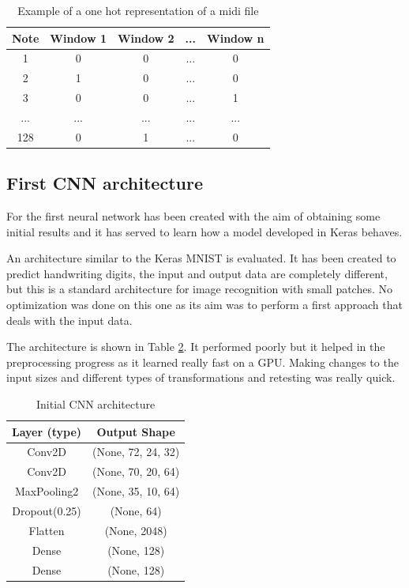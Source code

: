 \begin{table}
	\centering
	\caption{Example of a one hot representation of a midi file}
	\begin{tabular}{||c c c c c||} 
		\hline
		Note & Window 1 & Window 2 & ... & Window n \\ [0.5ex] 
		\hline\hline
		1 & 0 & 0 & ... & 0 \\ 
		\hline
		2 & 1 & 0 & ... & 0 \\
		\hline
		3 & 0 & 0 & ... & 1 \\
		\hline
		... & ... & ... & ... & ... \\
		\hline
		128 & 0 & 1 & ... & 0 \\ [1ex] 
		\hline
	\end{tabular}
	\label{table:one_hot}
\end{table}

\subsection{First CNN architecture}
For the first neural network has been created with the aim of obtaining some initial results and it has served to learn how a model developed in Keras \cite{keras} behaves.
\par
An architecture similar to the Keras MNIST is evaluated\cite{keras_mnist}. It has been created to predict handwriting digits, the input and output data are completely different, but this is a standard architecture for image recognition with small patches. No optimization was done on this one as its aim was to perform a first approach that deals with the input data. 
\par

The architecture is shown in Table \ref{table:initial}. It performed poorly but it helped in the preprocessing progress as it learned really fast on a GPU. Making changes to the input sizes and different types of transformations and retesting was really quick.


\begin{table} [h!]
	\centering
	\caption{Initial CNN architecture}
	\begin{tabular}{ |c|c|} 
		\hline
		Layer (type) & Output Shape  \\ \hline
		Conv2D &  (None, 72, 24, 32) \\ \hline
		Conv2D & (None, 70, 20, 64)\\ \hline
		MaxPooling2 & (None, 35, 10, 64) \\ \hline
		Dropout(0.25) & (None, 64)\\ \hline
		Flatten & (None, 2048) \\ \hline
		Dense & (None, 128) \\ \hline
		Dense & (None, 128) \\ \hline				
	\end{tabular}
	\label{table:initial}
\end{table}


